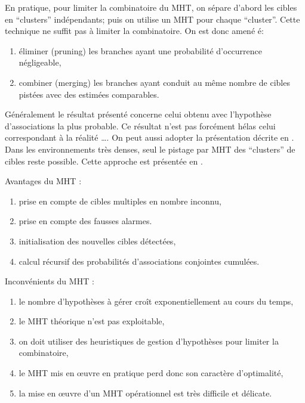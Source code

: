 \documentclass[10pt,french,a4paper]{report}
\begin{document}
En pratique, pour limiter la combinatoire du \ac{MHT}, on sépare d'abord les cibles en ``clusters'' indépendants; puis on utilise un \ac{MHT} pour chaque ``cluster''. Cette technique ne suffit pas à limiter la combinatoire. On est donc amené é:
\begin{enumerate}[label=\arabic*.]
\item éliminer (pruning) les branches ayant une probabilité d'occurrence négligeable,
\item combiner (merging) les branches ayant conduit au même nombre de cibles pistées avec des estimées comparables.
\end{enumerate}

Généralement le résultat présenté concerne celui obtenu avec l'hypothèse d'associations la plus probable.
Ce résultat n'est pas forcément hélas celui correspondant à la réalité \ldots. On peut aussi adopter la présentation décrite en \cite{Blackman1999}. Dans les environnements très denses, seul le pistage par \ac{MHT} des ``clusters''
de cibles reste possible. Cette approche est présentée en \cite{Demos1990}.

Avantages du \ac{MHT} :
\begin{enumerate}[label=\arabic*.]
\item prise en compte de cibles multiples en nombre inconnu,
\item prise en compte des fausses alarmes.  
\item initialisation des nouvelles cibles détectées,
\item calcul récursif des probabilités d'associations conjointes cumulées.
\end{enumerate}

Inconvénients du \ac{MHT} :
\begin{enumerate}[label=\arabic*.]
\item le nombre d'hypothèses à gérer croît exponentiellement au cours du temps,
\item le \ac{MHT} théorique n'est pas exploitable,
\item on doit utiliser des heuristiques de gestion d'hypothèses pour limiter la combinatoire,
\item le \ac{MHT} mis en \oe uvre en pratique perd donc son caractère d'optimalité,
\item la mise en \oe uvre d'un \ac{MHT} opérationnel est très difficile et délicate.
\end{enumerate}

\end{document}
